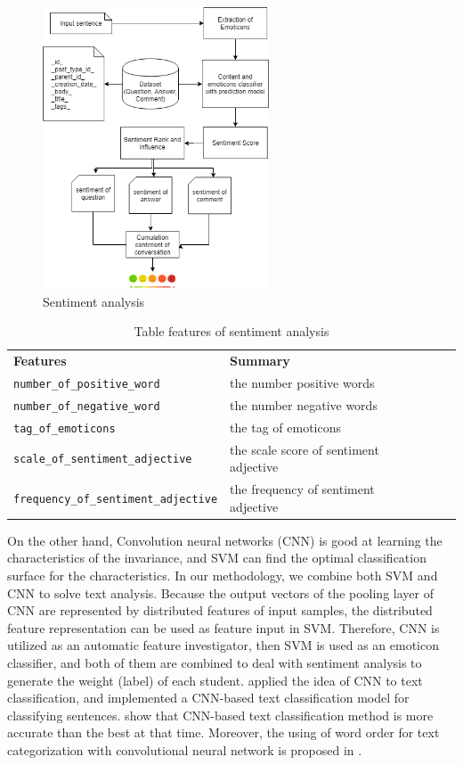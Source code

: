 \documentclass[letterpaper%
, twoside%
, 12pt%
,these%
, english%
,creativecommons,hyperref, withAlgo2e %
]{thETS}
\newcommand{\code}[1]{{\texttt{#1}}}
\begin{document}
\begin{figure}
	\includegraphics[width=0.6\textwidth]{Figures/st4.png}
	\caption{Sentiment analysis}
	\label{sentiment}
\end{figure}
\begin{table}[]
	\begin{tabular}{|l|l|lll}
		\cline{1-2}
		\textbf{Features}             & \textbf{Summary}              &  &  &  \\ \cline{1-2}
		\code{number\_of\_positive\_word}  & the number positive words  &  &  &  \\ \cline{1-2}
		\code{number\_of\_negative\_word}  & the number negative words  &  &  &  \\ \cline{1-2}
		\code{tag\_of\_emoticons}  & the tag of emoticons  &  &  &  \\ \cline{1-2}
		\code{scale\_of\_sentiment\_adjective}  & the scale score of sentiment adjective  &  &  &  \\ \cline{1-2}
		\code{frequency\_of\_sentiment\_adjective}  & the frequency  of sentiment adjective  &  &  &  \\ \cline{1-2}
	\end{tabular}
	\caption{Table features of sentiment analysis}
	\label{tab:svm}
\end{table}
On the other hand, Convolution neural networks (CNN) is good at learning the characteristics of the invariance, and SVM can find the optimal classification surface for the characteristics. In our methodology, we combine both SVM and CNN to solve text analysis. Because the output vectors of the pooling layer of CNN are represented by distributed features of input samples, the distributed feature representation can be used as feature input in SVM. Therefore, CNN is utilized as an automatic feature investigator, then SVM is used as an emoticon classifier, and both of them are combined to deal with sentiment analysis to generate the weight (label) of each student. \cite{Kim} applied the idea of CNN to text classification, and implemented a CNN-based text classification model for classifying sentences. show that CNN-based text classification method is more accurate than the best at that time.  Moreover, the using of word order for text categorization with convolutional neural network is proposed in \cite{Johnson}. 
\end{document}
